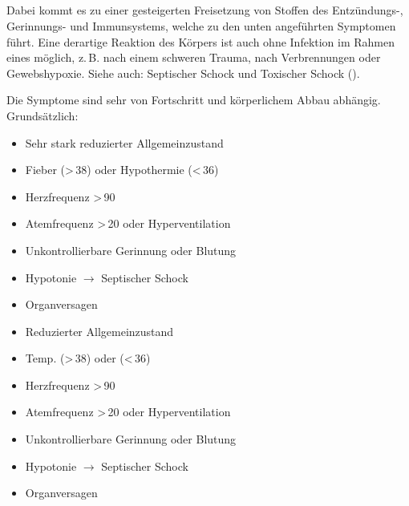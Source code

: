 \subsection{}
\label{topic:sepsis}

\Text{{\TxBeschreibung}}
{%
Dabei kommt es zu einer gesteigerten Freisetzung von Stoffen des Entzündungs-, Gerinnungs- und Immunsystems, welche zu den unten angeführten Symptomen führt. Eine derartige Reaktion des Körpers ist auch ohne Infektion im Rahmen eines  möglich, z.\,B. nach einem schweren Trauma, nach Verbrennungen oder Gewebshypoxie.
Siehe auch: Septischer Schock und Toxischer Schock ().
}


\clearpage%

\TextSlide{\TxSymptome}
{%
Die Symptome sind sehr von Fortschritt und
körperlichem Abbau abhängig. Grundsätzlich:
\begin{itemize}
  \item Sehr stark reduzierter Allgemeinzustand
  \item Fieber ({\textgreater}\,38{\DegC}) oder
  Hypothermie ({\textless}\,36{\DegC})
  \item Herzfrequenz {\textgreater}\,90\nicefrac{}{\Min}
  \item Atemfrequenz {\textgreater}\,20\nicefrac{}{\Min} oder
  Hyperventilation
  \item Unkontrollierbare Gerinnung oder Blutung
  \item Hypotonie ${\rightarrow}$ Septischer Schock
  \item Organversagen
\end{itemize}
}{
\begin{itemize}
  \item Reduzierter Allgemeinzustand
  \item Temp. ({\textgreater}\,38{\DegC}) oder
  ({\textless}\,36{\DegC})
  \item Herzfrequenz {\textgreater}\,90\nicefrac{}{\Min}
  \item Atemfrequenz {\textgreater}\,20\nicefrac{}{\Min} oder
  Hyperventilation
  \item Unkontrollierbare Gerinnung oder Blutung
  \item Hypotonie ${\rightarrow}$ Septischer Schock
  \item Organversagen
\end{itemize}
}

